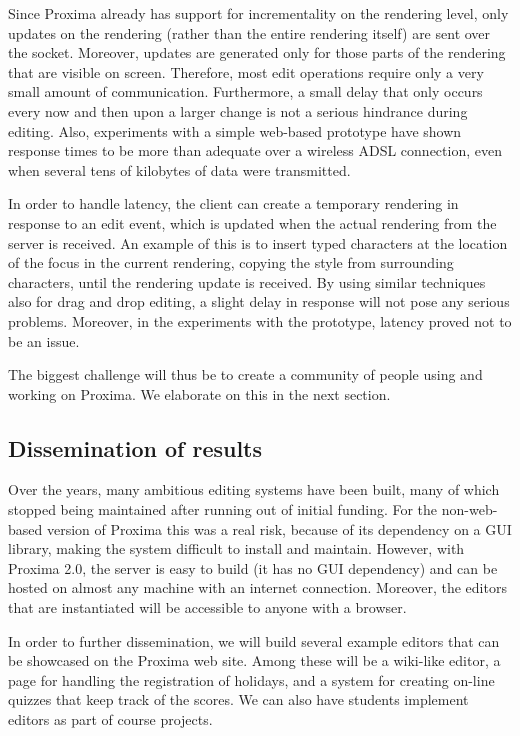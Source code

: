 \documentclass[10pt]{article}
\begin{document}
Since Proxima already has support for incrementality on the rendering level, only updates on the rendering (rather than the entire rendering itself) are sent over the socket. Moreover, updates are generated only for those parts of the rendering that are visible on screen. Therefore, most edit operations require only a very small amount of communication. Furthermore, a small delay that only occurs every now and then upon a larger change is not a serious hindrance during editing. Also, experiments with a simple web-based prototype have shown response times to be more than adequate over a wireless ADSL connection, even when several tens of kilobytes of data were transmitted. 

In order to handle latency, the client can create a temporary rendering in response to an edit event, which is updated when the actual rendering from the server is received. An example of this is to insert typed characters at the location of the focus in the current rendering, copying the style from surrounding characters, until the rendering update is received. By using similar techniques also for drag and drop editing, a slight delay in response will not pose any serious problems. Moreover, in the experiments with the prototype, latency proved not to be an issue.

The biggest challenge will thus be to create a community of people using and working on Proxima. We elaborate on this in the next section.

\subsection{Dissemination of results}

Over the years, many ambitious editing systems have been built, many of which stopped being maintained after running out of initial funding. For the non-web-based version of Proxima this was a real risk, because of its dependency on a GUI library, making the system difficult to install and maintain. However, with Proxima 2.0, the server is easy to build (it has no GUI dependency) and can be hosted on almost any machine with an internet connection. Moreover, the editors that are instantiated will be accessible to anyone with a browser.

In order to further dissemination, we will build several example editors that can be showcased on the Proxima web site. Among these will be a wiki-like editor, a page for handling the registration of holidays,  and a system for creating on-line quizzes that keep track of the scores. We can also have students implement editors as part of course projects.
\end{document}
